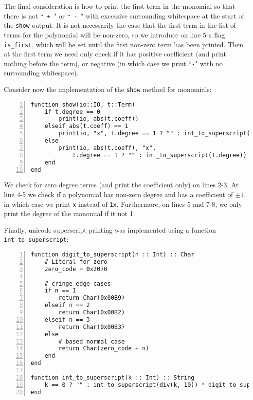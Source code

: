 \documentclass{article}
\theoremstyle{plain}
\numberwithin{theorem}{section}
\numberwithin{example}{section}
\theoremstyle{definition}
\numberwithin{definition}{section}
\begin{document}
The final consideration is how to print the first term in the monomial so that
there is not ``\texttt{ + }" or ``\texttt{ - }" with excessive surrounding
whitespace at the start of the \texttt{show} output. It is not necessarily the
case that the first term in the list of terms for the polynomial will be
non-zero, so we introduce on line 5 a flag \texttt{is\_first}, which will be set
until the first non-zero term has been printed. Then at the first term we need
only check if it has positive coefficient (and print nothing before the term),
or negative (in which case we print ``\texttt{-}" with no surrounding
whitespace). \medbreak

Consider now the implementation of the \texttt{show} method for monomials:

\begin{codebox}
    \begin{Verbatim}[numbers=left,xleftmargin=5mm]
function show(io::IO, t::Term)
    if t.degree == 0
        print(io, abs(t.coeff))
    elseif abs(t.coeff) == 1
        print(io, "x", t.degree == 1 ? "" : int_to_superscript(t.degree))
    else
        print(io, abs(t.coeff), "x",
            t.degree == 1 ? "" : int_to_superscript(t.degree))
    end
end
    \end{Verbatim}
\end{codebox}

We check for zero degree terms (and print the coefficient only) on lines 2-3. At
line 4-5 we check if a polynomial has non-zero degree and has a coefficient of
$\pm 1$, in which case we print \texttt{x} instead of \texttt{1x}. Furthermore,
on lines 5 and 7-8, we only print the degree of the monomial if it not 1.
\medbreak

Finally, unicode superscript printing was implemented using a function
\texttt{int\_to\_superscript}:

\begin{codebox}
    \begin{Verbatim}[numbers=left,xleftmargin=5mm]
function digit_to_superscript(n :: Int) :: Char
    # Literal for zero
    zero_code = 0x2070
    
    # cringe edge cases
    if n == 1
        return Char(0x00B9)
    elseif n == 2
        return Char(0x00B2)
    elseif n == 3
        return Char(0x00B3)
    else
        # based normal case
        return Char(zero_code + n)
    end
end

function int_to_superscript(k :: Int) :: String
    k == 0 ? "" : int_to_superscript(div(k, 10)) * digit_to_superscript(mod(k, 10))
end
    \end{Verbatim}
\end{codebox}
\end{document}
